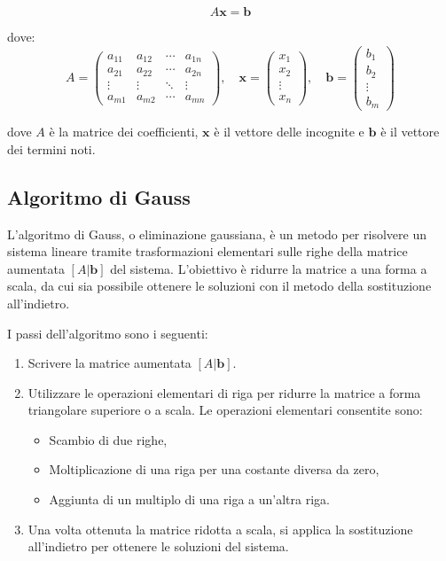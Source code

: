 \documentclass{article}
\begin{document}
\[
	A \mathbf{x} = \mathbf{b}
\]

dove:
\[
	A = \begin{pmatrix}
		a_{11} & a_{12} & \cdots & a_{1n} \\
		a_{21} & a_{22} & \cdots & a_{2n} \\
		\vdots & \vdots & \ddots & \vdots \\
		a_{m1} & a_{m2} & \cdots & a_{mn}
	\end{pmatrix}, \quad
	\mathbf{x} = \begin{pmatrix}
		x_1    \\
		x_2    \\
		\vdots \\
		x_n
	\end{pmatrix}, \quad
	\mathbf{b} = \begin{pmatrix}
		b_1    \\
		b_2    \\
		\vdots \\
		b_m
	\end{pmatrix}
\]

dove \( A \) è la matrice dei coefficienti, \( \mathbf{x} \) è il vettore delle
incognite e \( \mathbf{b} \) è il vettore dei termini noti.

\subsection{Algoritmo di Gauss}

L'algoritmo di Gauss, o eliminazione gaussiana, è un metodo per risolvere un
sistema lineare tramite trasformazioni elementari sulle righe della matrice
aumentata \( [A | \mathbf{b}] \) del sistema. L'obiettivo è ridurre la matrice
a una forma a scala, da cui sia possibile ottenere le soluzioni con il metodo
della sostituzione all'indietro.

I passi dell'algoritmo sono i seguenti:
\begin{enumerate}
	\item Scrivere la matrice aumentata \( [A | \mathbf{b}] \).
	\item Utilizzare le operazioni elementari di riga per ridurre la matrice a forma
	      triangolare superiore o a scala. Le operazioni elementari consentite sono:
	      \begin{itemize}
		      \item Scambio di due righe,
		      \item Moltiplicazione di una riga per una costante diversa da zero,
		      \item Aggiunta di un multiplo di una riga a un'altra riga.
	      \end{itemize}
	\item Una volta ottenuta la matrice ridotta a scala, si applica la sostituzione
	      all'indietro per ottenere le soluzioni del sistema.
\end{enumerate}
\end{document}
